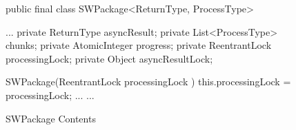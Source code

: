 \begin{figure}[h]
\begin{sourcecode}
\begin{javacode}{}
public final class SWPackage<ReturnType, ProcessType> {
	...
	private ReturnType asyncResult;
	private List<ProcessType> chunks;
	private AtomicInteger progress;
	private ReentrantLock processingLock;
	private Object asyncResultLock;

	SWPackage(ReentrantLock processingLock ) {
		this.processingLock = processingLock;
		...
	}
	...
}
\end{javacode}
\caption{SWPackage Contents}
\label{code:swpackage-contain}
\end{sourcecode}
\end{figure}